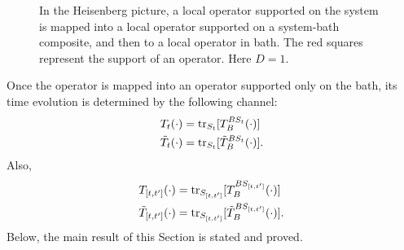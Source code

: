 \documentclass[prx,aps,amsmath,amssymb,floatfix,superscriptaddress,11pt,tightenlines,longbibliography,onecolumn,notitlepage]{revtex4-1}
\newcommand{\Tr}{\textnormal{tr}}
\begin{document}
\begin{figure}[h]
\caption{In the Heisenberg picture, a local operator supported on the system is mapped into a local operator supported on a system-bath composite, and then to a local operator in bath. The red squares represent the support of an operator. Here $D=1$.\label{fig:reduction}}
\end{figure}

Once the operator is mapped into an operator supported only on the bath, its time evolution is determined by the following channel:
\begin{equation}
  \begin{aligned}
    T_{t}(\cdot) &= \Tr_{S_t}[T_B^{BS_t}(\cdot)] \\
    \tilde{T}_t(\cdot) &= \Tr_{S_t}[\tilde{T}_B^{BS_t}(\cdot)].
  \end{aligned}
\end{equation}
Also,
\begin{equation}
  \label{eq:bath_dynamics}
  \begin{aligned}
    T_{[t,t']}(\cdot) &= \Tr_{S_{[t,t']}}[T_B^{BS_{[t,t']}}(\cdot)]  \\
    \tilde{T}_{[t,t']}(\cdot) &= \Tr_{S_{[t,t']}}[\tilde{T}_B^{BS_{[t,t']}}(\cdot)].
  \end{aligned}
\end{equation}
Below, the main result of this Section is stated and proved.
\end{document}
